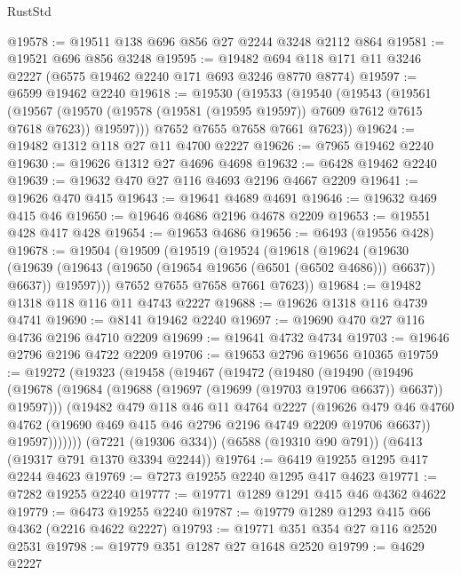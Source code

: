 \begin{lexlean}{RustStd}
\begin{coremodule}
@19578 := @19511 @138 @696 @856 @27 @2244 @3248 @2112 @864
@19581 := @19521 @696 @856 @3248
@19595 := @19482 @694 @118 @171 @11 @3246 @2227 (@6575 @19462 @2240 @171 @693 @3246 @8770 @8774)
@19597 := @6599 @19462 @2240
@19618 := @19530
    (@19533
      (@19540
        (@19543
          (@19561
            (@19567
              (@19570 (@19578 (@19581 (@19595 @19597)) @7609 @7612 @7615 @7618 @7623))
              @19597)))
        @7652
        @7655
        @7658
        @7661
        @7623))
@19624 := @19482 @1312 @118 @27 @11 @4700 @2227
@19626 := @7965 @19462 @2240
@19630 := @19626 @1312 @27 @4696 @4698
@19632 := @6428 @19462 @2240
@19639 := @19632 @470 @27 @116 @4693 @2196 @4667 @2209
@19641 := @19626 @470 @415
@19643 := @19641 @4689 @4691
@19646 := @19632 @469 @415 @46
@19650 := @19646 @4686 @2196 @4678 @2209
@19653 := @19551 @428 @417 @428
@19654 := @19653 @4686
@19656 := @6493 (@19556 @428)
@19678 := @19504
    (@19509
      (@19519
        (@19524
          (@19618
            (@19624
              (@19630 (@19639 (@19643 (@19650 (@19654 @19656 (@6501 (@6502 @4686))) @6637)) @6637))
              @19597)))
        @7652
        @7655
        @7658
        @7661
        @7623))
@19684 := @19482 @1318 @118 @116 @11 @4743 @2227
@19688 := @19626 @1318 @116 @4739 @4741
@19690 := @8141 @19462 @2240
@19697 := @19690 @470 @27 @116 @4736 @2196 @4710 @2209
@19699 := @19641 @4732 @4734
@19703 := @19646 @2796 @2196 @4722 @2209
@19706 := @19653 @2796 @19656 @10365
@19759 := @19272
    (@19323
      (@19458
        (@19467
          (@19472
            (@19480
              (@19490
                (@19496
                  (@19678 (@19684 (@19688 (@19697 (@19699 (@19703 @19706 @6637)) @6637)) @19597)))
                (@19482
                  @479
                  @118
                  @46
                  @11
                  @4764
                  @2227
                  (@19626
                    @479
                    @46
                    @4760
                    @4762
                    (@19690 @469 @415 @46 @2796 @2196 @4749 @2209 @19706 @6637))
                  @19597)))))))
    (@7221 (@19306 @334))
    (@6588 (@19310 @90 @791))
    (@6413 (@19317 @791 @1370 @3394 @2244))
@19764 := @6419 @19255 @1295 @417 @2244 @4623
@19769 := @7273 @19255 @2240 @1295 @417 @4623
@19771 := @7282 @19255 @2240
@19777 := @19771 @1289 @1291 @415 @46 @4362 @4622
@19779 := @6473 @19255 @2240
@19787 := @19779 @1289 @1293 @415 @66 @4362 (@2216 @4622 @2227)
@19793 := @19771 @351 @354 @27 @116 @2520 @2531
@19798 := @19779 @351 @1287 @27 @1648 @2520
@19799 := @4629 @2227

\end{coremodule}
\end{lexlean}
